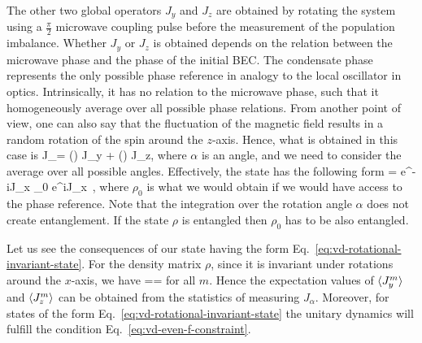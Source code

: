 The other two global operators $J_y$ and $J_z$ are obtained by rotating the system using a $\frac{\pi}{2}$ microwave coupling pulse before the measurement of the population imbalance.
Whether $J_y$ or $J_z$ is obtained depends on the relation between the microwave phase and the phase of the initial BEC.
The condensate phase represents the only possible phase reference in analogy to the local oscillator in optics.
Intrinsically, it has no relation to the microwave phase, such that it homogeneously average over all possible phase relations.
From another point of view, one can also say that the fluctuation of the magnetic field results in a random rotation of the spin around the $z$-axis.
Hence, what is obtained in this case is
\be
  J_\alpha = \sin(\alpha) J_y + \cos(\alpha) J_z,
\ee
where $\alpha$ is an angle, and we need to consider the average over all possible angles.
Effectively, the state has the following form
\be
  \rho = \int e^{-i\alpha J_x} \rho_0 e^{i\alpha J_x}\, \alpha,
  \label{eq:vd-rotational-invariant-state}
\ee
where $\rho_0$ is what we would obtain if we would have access to the phase reference.
Note that the integration over the rotation angle $\alpha$ does not create entanglement.
If the state $\rho$ is entangled then $\rho_0$ has to be also entangled.

Let us see the consequences of our state having the form  Eq.~\eqref{eq:vd-rotational-invariant-state}.
For the density matrix $\rho$, since it is invariant under rotations around the $x$-axis, we have
\be
  ==
\ee
for all $m$.
Hence the expectation values of $\langle{J_y^m}\rangle$ and $\langle{J_z^m}\rangle$ can be obtained from the statistics of measuring $J_\alpha$.
Moreover, for states of the form Eq.~\eqref{eq:vd-rotational-invariant-state} the unitary dynamics will fulfill the condition Eq.~\eqref{eq:vd-even-f-constraint}.

